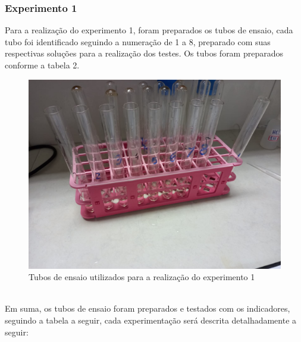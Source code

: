 \documentclass[a4paper, 11pt]{article}
\begin{document}
    \subsubsection{Experimento 1}\label{sec:mat_metodos_exp1}
        \indent Para a realização do experimento 1, foram preparados os tubos de ensaio, cada tubo foi identificado seguindo a numeração de 1 a 8, preparado com suas respectivas soluções para a realização dos testes. Os tubos foram preparados conforme a tabela 2.
        \begin{figure}[h]
            \centering
            \includegraphics[scale=0.25]{pictures/tubos.jpeg}
            \caption{Tubos de ensaio utilizados para a realização do experimento 1}\label{fig:figure2}
        \end{figure}\\
        \indent Em suma, os tubos de ensaio foram preparados e testados com os indicadores, seguindo a tabela a seguir, cada experimentação será descrita detalhadamente a seguir:
\end{document}
